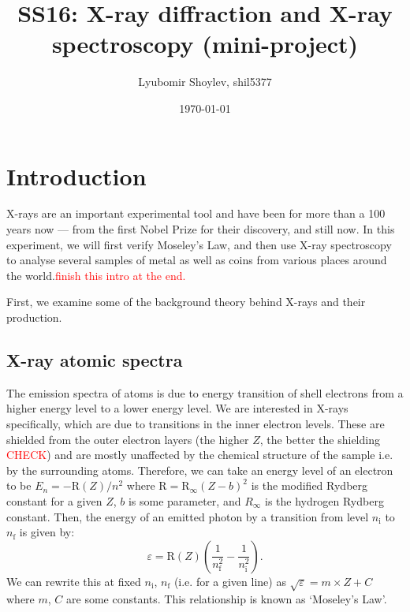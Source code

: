 \documentclass[11pt,a4paper,twoside,onecolumn]{article}
\title{\textbf{SS16: X-ray diffraction and X-ray spectroscopy (mini-project)}}
\author{Lyubomir Shoylev, shil5377}
\date{\today}
\newcommand{\reminder}[1]{\textcolor{red}{#1}}
\newcommand{\rydberg}{\mathrm{R}}
\begin{document}
\maketitle

\begin{abstract}
    \lipsum
\end{abstract}

\section{Introduction}

X-rays are an important experimental tool and have been for more than a 100 years now --- from the first Nobel Prize for their discovery, and still now. In this experiment, we will first verify Moseley's Law, and then use X-ray spectroscopy to analyse several samples of metal as well as coins from various places around the world.\reminder{finish this intro at the end.} %

First, we examine some of the background theory behind X-rays and their production.

\subsection{X-ray atomic spectra}
The emission spectra of atoms is due to energy transition of shell electrons from a higher energy level to a lower energy level. We are interested in X-rays specifically, which are due to transitions in the inner electron levels. These are shielded from the outer electron layers (the higher $Z$, the better the shielding \reminder{CHECK}) and are mostly unaffected by the chemical structure of the sample i.e. by the surrounding atoms. Therefore, we can take an energy level of an electron to be $E_n = -\rydberg\left(Z\right) / n^2$ where $\rydberg = \rydberg_\infty \left(Z - b\right)^2$ is the modified Rydberg constant for a given $Z$, $b$ is some parameter, and $R_\infty$ is the hydrogen Rydberg constant. Then, the energy of an emitted photon by a transition from level $n_\mathrm{i}$ to $n_\mathrm{f}$ is given by:
\begin{equation}
    \varepsilon = \rydberg\left(Z\right) \left(\frac{1}{n_\mathrm{f}^2} - \frac{1}{n_\mathrm{i}^2}\right).
\end{equation}
We can rewrite this at fixed $n_\mathrm{i}$, $n_\mathrm{f}$ (i.e. for a given line) as $\sqrt{\varepsilon} = m \times Z + C$ where $m$, $C$ are some constants. This relationship is known as `Moseley's Law'.
\end{document}
